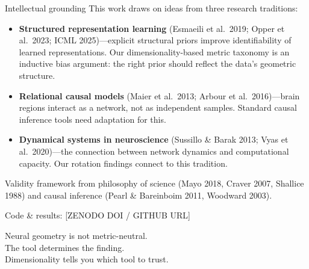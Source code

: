 \documentclass[aspectratio=169,11pt]{beamer}
\begin{document}
\begin{frame}{Intellectual grounding}
This work draws on ideas from three research traditions:

\vspace{0.5em}
\begin{itemize}
  \item \textbf{Structured representation learning} (Esmaeili et al.\ 2019; Opper et al.\ 2023; ICML 2025)---explicit structural priors improve identifiability of learned representations. Our dimensionality-based metric taxonomy is an inductive bias argument: the right prior should reflect the data's geometric structure.
  \item \textbf{Relational causal models} (Maier et al.\ 2013; Arbour et al.\ 2016)---brain regions interact as a network, not as independent samples. Standard causal inference tools need adaptation for this.
  \item \textbf{Dynamical systems in neuroscience} (Sussillo \& Barak 2013; Vyas et al.\ 2020)---the connection between network dynamics and computational capacity. Our rotation findings connect to this tradition.
\end{itemize}

\vspace{0.5em}
Validity framework from philosophy of science (Mayo 2018, Craver 2007, Shallice 1988) and causal inference (Pearl \& Bareinboim 2011, Woodward 2003).
\end{frame}

\begin{frame}[standout]
  Code \& results: {\small [ZENODO DOI / GITHUB URL]}

  \vspace{1em}
  Neural geometry is not metric-neutral.\\[0.3em]
  The tool determines the finding.\\[0.3em]
  Dimensionality tells you which tool to trust.
\end{frame}
\end{document}
